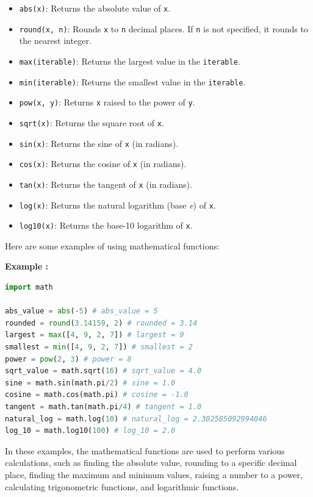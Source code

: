 \documentclass[12pt]{book}
\newtheorem{Example}{Example}[chapter]
\renewenvironment{Example}{\begin{trivlist}\item\relax
\textbf{Example \thesection: }}{\end{trivlist}}
\begin{document}
\begin{itemize}
\item \texttt{abs(x)}: Returns the absolute value of \texttt{x}.
\item \texttt{round(x, n)}: Rounds \texttt{x} to \texttt{n} decimal places. If \texttt{n} is not specified, it rounds to the nearest integer.
\item \texttt{max(iterable)}: Returns the largest value in the \texttt{iterable}.
\item \texttt{min(iterable)}: Returns the smallest value in the \texttt{iterable}.
\item \texttt{pow(x, y)}: Returns \texttt{x} raised to the power of \texttt{y}.
\item \texttt{sqrt(x)}: Returns the square root of \texttt{x}.
\item \texttt{sin(x)}: Returns the sine of \texttt{x} (in radians).
\item \texttt{cos(x)}: Returns the cosine of \texttt{x} (in radians).
\item \texttt{tan(x)}: Returns the tangent of \texttt{x} (in radians).
\item \texttt{log(x)}: Returns the natural logarithm (base \textit{e}) of \texttt{x}.
\item \texttt{log10(x)}: Returns the base-10 logarithm of \texttt{x}.
\end{itemize}

Here are some examples of using mathematical functions:

\begin{Example}
\begin{lstlisting}[language=Python]
import math

abs_value = abs(-5) # abs_value = 5
rounded = round(3.14159, 2) # rounded = 3.14
largest = max([4, 9, 2, 7]) # largest = 9
smallest = min([4, 9, 2, 7]) # smallest = 2
power = pow(2, 3) # power = 8
sqrt_value = math.sqrt(16) # sqrt_value = 4.0
sine = math.sin(math.pi/2) # sine = 1.0
cosine = math.cos(math.pi) # cosine = -1.0
tangent = math.tan(math.pi/4) # tangent = 1.0
natural_log = math.log(10) # natural_log = 2.302585092994046
log_10 = math.log10(100) # log_10 = 2.0
\end{lstlisting}
\end{Example}

In these examples, the mathematical functions are used to perform various calculations, such as finding the absolute value, rounding to a specific decimal place, finding the maximum and minimum values, raising a number to a power, calculating trigonometric functions, and logarithmic functions.
\end{document}
